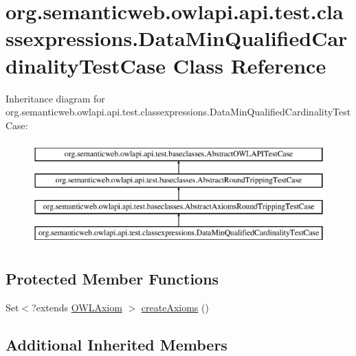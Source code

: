 \hypertarget{classorg_1_1semanticweb_1_1owlapi_1_1api_1_1test_1_1classexpressions_1_1_data_min_qualified_cardinality_test_case}{\section{org.\-semanticweb.\-owlapi.\-api.\-test.\-classexpressions.\-Data\-Min\-Qualified\-Cardinality\-Test\-Case Class Reference}
\label{classorg_1_1semanticweb_1_1owlapi_1_1api_1_1test_1_1classexpressions_1_1_data_min_qualified_cardinality_test_case}
}
Inheritance diagram for org.\-semanticweb.\-owlapi.\-api.\-test.\-classexpressions.\-Data\-Min\-Qualified\-Cardinality\-Test\-Case\-:\begin{figure}[H]
\begin{center}
\leavevmode
\includegraphics[height=4.000000cm]{classorg_1_1semanticweb_1_1owlapi_1_1api_1_1test_1_1classexpressions_1_1_data_min_qualified_cardinality_test_case}
\end{center}
\end{figure}
\subsection*{Protected Member Functions}
\begin{DoxyCompactItemize}
\item 
Set$<$?extends \hyperlink{interfaceorg_1_1semanticweb_1_1owlapi_1_1model_1_1_o_w_l_axiom}{O\-W\-L\-Axiom} $>$ \hyperlink{classorg_1_1semanticweb_1_1owlapi_1_1api_1_1test_1_1classexpressions_1_1_data_min_qualified_cardinality_test_case_a9f897438121b9b48640132dcc1d0f36a}{create\-Axioms} ()
\end{DoxyCompactItemize}
\subsection*{Additional Inherited Members}



